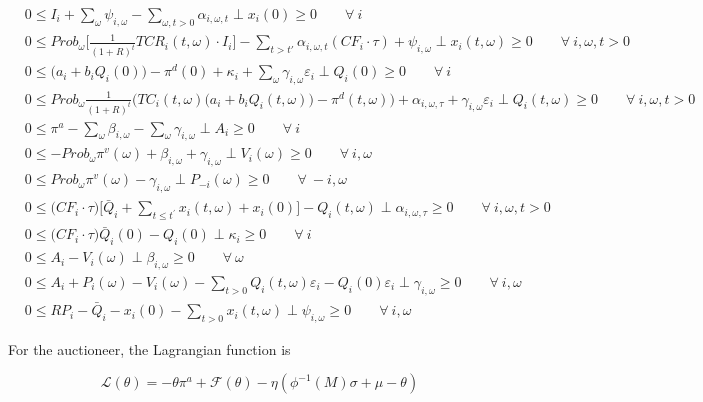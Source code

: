 \documentclass[11pt, letterpaper]{article}
\begin{document}
\begin{appendices}
\footnotesize{
\begin{align}
    & 0 \leq I_i  + \sum_{\omega}\psi_{i,\omega} -\sum_{\omega, t>0} \alpha_{i,\omega,t} \perp  x_i(0) \geq 0  \qquad \forall \  i \\
    & 0 \leq Prob_\omega \Bigg[\frac{1}{(1+R)^t}TCR_i(t,\omega) \cdot I_i \Bigg] - \sum_{t> t\prime}\alpha_{i,\omega,t} ( CF_i \cdot \tau)+ \psi_{i,\omega} \perp x_i(t,\omega) \geq 0  \qquad  \forall \  i, \omega, t> 0\\
    &  0 \leq  \big(a_{i}+b_i Q_{i}(0)\big)-\pi^d(0) + \kappa_i  + \sum_{\omega} \gamma_{i,\omega}\varepsilon_i \perp  Q_{i}(0) \geq 0 \qquad \forall \  i  \\
    &  0 \leq  Prob_\omega  \frac{1}{(1+R)^t} \bigg( TC_i(t,\omega) \big(a_{i}+b_i Q_i(t,\omega)\big ) -\pi^d(t,\omega) \bigg) + \alpha_{i,\omega,\tau} + \gamma_{i,\omega} \varepsilon_{i} \perp Q_i(t,\omega) \geq 0 \qquad  \forall \ i, \omega, t > 0\\
    & 0 \leq \pi^{a} - \sum_{\omega}\beta_{i,\omega} - \sum_{\omega}\gamma_{i,\omega} \perp A_i \geq 0 \qquad \forall \  i  \label{eq:pi_a_appendix}\\
    & 0 \leq -Prob_\omega \pi^v(\omega) + \beta_{i,\omega}  + \gamma_{i,\omega} \perp V_i(\omega) \geq 0 \qquad \forall \  i, \omega \\
    &  0 \leq Prob_\omega \pi^v(\omega) -\gamma_{i,\omega} \perp P_{-i}(\omega) \geq 0 \qquad \forall  \ -i,\omega \\
    & 0 \leq \big(CF_i \cdot \tau \big) \Bigg[\bar{Q}_i + \sum_{t\leq t^{\prime}} x_i(t,\omega) + x_i(0) \Bigg] - Q_i(t,\omega)  \perp \alpha_{i,\omega,\tau} \geq 0 \qquad \forall \ i, \omega, t  > 0\\
    & 0 \leq \Big(CF_i\cdot\tau \Big)\bar{Q}_i(0)-Q_{i}(0) \perp \kappa_i \geq 0 \qquad \forall \ i \\
    & 0 \leq  A_{i} - V_i(\omega) \perp \beta_{i,\omega} \geq 0 \qquad \forall  \ \omega \\
    & 0 \leq  A_{i} + P_{i} (\omega) - V_i(\omega) - \sum_{t>0} Q_i(t,\omega) \varepsilon_{i} -Q_i(0)\varepsilon_{i} \perp \gamma_{i,\omega} \geq 0 \qquad \forall \ i, \omega\\
    & 0 \leq  RP_i - \bar{Q}_i - x_i(0) - \sum_{t>0} x_i(t,\omega) \perp \psi_{i,\omega} \geq 0 \qquad \forall \ i,\omega 
\end{align}
}


\normalsize
For the auctioneer, the Lagrangian function is 

\begin{equation}
    \mathcal{L}(\theta)= -\theta \pi^{a} + \mathcal{F}(\theta) - \eta (\phi^{-1}(M) \sigma+ \mu - \theta)
\end{equation}


\end{appendices}
\end{document}
